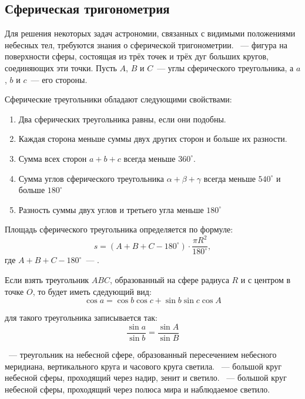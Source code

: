 \subsection{Сферическая тригонометрия}
Для решения некоторых задач астрономии, связанных с видимыми положениями небесных тел, требуются знания о сферической тригонометрии. ~--- фигура на поверхности сферы, состоящая из трёх точек и трёх дуг больших кругов, соединяющих эти точки. Пусть $A$, $B$ и $C$~--- углы сферического треугольника, а $a$, $b$ и $c$~--- его стороны.

Сферические треугольники обладают следующими свойствами:
\begin{enumerate}
\item Два сферических треугольника равны, если они подобны.
\item Каждая сторона меньше суммы двух других сторон и больше их разности.
\item Сумма всех сторон $a+b+c$ всегда меньше $360^{\circ}$.
\item Сумма углов сферического треугольника $\alpha +\beta +\gamma$ всегда меньше $540^{\circ}$  и больше $180^{\circ}$
\item Разность суммы двух углов и третьего угла меньше $180^{\circ}$
\end{enumerate}

Площадь сферического треугольника определяется по формуле:
\begin{equation}
s=(A+B+C-180^{\circ}) \cdot \frac{\pi R^2}{180^{\circ}},
\end{equation}
где $A+B+C-180^{\circ}$~--- .

Если взять треугольник $ABC$, образованный на сфере радиуса $R$ и с центром в точке $O$, то  будет иметь сдедующий вид:
\begin{equation}
\cos a=\cos b\cos c+\sin b\sin c\cos A
\end{equation}

 для такого треугольника записывается так:
\begin{equation}
\frac{\sin a}{\sin b}=\frac{\sin A}{\sin B}
\end{equation}

~--- треугольник на небесной  сфере, образованный пересечением небесного меридиана, вертикального круга и часового круга светила. ~--- большой круг небесной сферы, проходящий через надир, зенит и светило. ~--- большой круг небесной сферы, проходящий через полюса мира и наблюдаемое светило.

